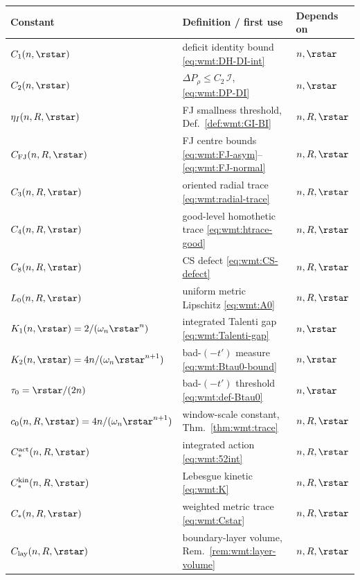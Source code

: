 \begin{center}
\begin{tabular}{lll}
\hline
Constant & Definition / first use & Depends on \\
\hline
$C_1(n,\rstar)$ & deficit identity bound \eqref{eq:wmt:DH-DI-int} & $n,\rstar$ \\
$C_2(n,\rstar)$ & $\Delta P_\rho\le C_2\,\mathcal I$, \eqref{eq:wmt:DP-DI} & $n,\rstar$ \\
$\eta_I(n,R,\rstar)$ & FJ smallness threshold, Def.~\ref{def:wmt:GI-BI} & $n,R,\rstar$ \\
$C_{\mathrm{FJ}}(n,R,\rstar)$ & FJ centre bounds \eqref{eq:wmt:FJ-asym}--\eqref{eq:wmt:FJ-normal} & $n,R,\rstar$ \\
$C_3(n,R,\rstar)$ & oriented radial trace \eqref{eq:wmt:radial-trace} & $n,R,\rstar$ \\
$C_4(n,R,\rstar)$ & good-level homothetic trace \eqref{eq:wmt:htrace-good} & $n,R,\rstar$ \\
$C_8(n,R,\rstar)$ & CS defect \eqref{eq:wmt:CS-defect} & $n,R,\rstar$ \\
$L_0(n,R,\rstar)$ & uniform metric Lipschitz \eqref{eq:wmt:A0} & $n,R,\rstar$ \\
$K_1(n,\rstar)=2/(\omega_n\rstar^n)$ & integrated Talenti gap \eqref{eq:wmt:Talenti-gap} & $n,\rstar$ \\
$K_2(n,\rstar)=4n/(\omega_n\rstar^{n+1})$ & bad-$(-t')$ measure \eqref{eq:wmt:Btau0-bound} & $n,\rstar$ \\
$\tau_0=\rstar/(2n)$ & bad-$(-t')$ threshold \eqref{eq:wmt:def-Btau0} & $n,\rstar$ \\
$c_0(n,R,\rstar)=4n/(\omega_n\rstar^{n+1})$ & window-scale constant, Thm.~\ref{thm:wmt:trace} & $n,R,\rstar$ \\
$C_*^{\mathrm{act}}(n,R,\rstar)$ & integrated action \eqref{eq:wmt:52int} & $n,R,\rstar$ \\
$C_*^{\mathrm{kin}}(n,R,\rstar)$ & Lebesgue kinetic \eqref{eq:wmt:K} & $n,R,\rstar$ \\
$C_*(n,R,\rstar)$ & weighted metric trace \eqref{eq:wmt:Cstar} & $n,R,\rstar$ \\
$C_{\mathrm{lay}}(n,R,\rstar)$ & boundary-layer volume, Rem.~\ref{rem:wmt:layer-volume} & $n,R,\rstar$ \\
\hline
\end{tabular}
\end{center}

